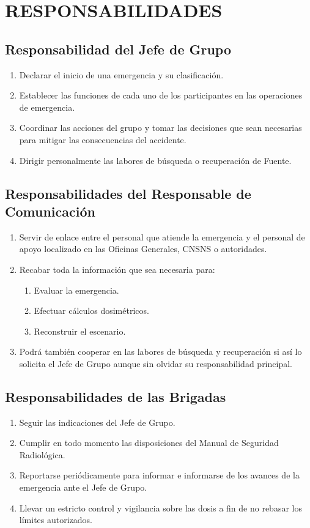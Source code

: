 \section*{RESPONSABILIDADES}

\subsection*{Responsabilidad del Jefe de Grupo}
\begin{enumerate}
    \item Declarar el inicio de una emergencia y su clasificación.
    \item Establecer las funciones de cada uno de los participantes en las operaciones de emergencia.
    \item Coordinar las acciones del grupo y tomar las decisiones que sean necesarias para mitigar las consecuencias del accidente.
    \item Dirigir personalmente las labores de búsqueda o recuperación de Fuente.
\end{enumerate}

\subsection*{Responsabilidades del Responsable de Comunicación}
\begin{enumerate}
    \item Servir de enlace entre el personal que atiende la emergencia y el personal de apoyo localizado en las Oficinas Generales, CNSNS o autoridades.
    \item Recabar toda la información que sea necesaria para:
    \begin{enumerate}[label=\roman*.]
        \item Evaluar la emergencia.
        \item Efectuar cálculos dosimétricos.
        \item Reconstruir el escenario.
    \end{enumerate}
    \item Podrá también cooperar en las labores de búsqueda y recuperación si así lo solicita el Jefe de Grupo aunque sin olvidar su responsabilidad principal.
\end{enumerate}

\subsection*{Responsabilidades de las Brigadas}
\begin{enumerate}
    \item Seguir las indicaciones del Jefe de Grupo.
    \item Cumplir en todo momento las disposiciones del Manual de Seguridad Radiológica.
    \item Reportarse periódicamente para informar e informarse de los avances de la emergencia ante el Jefe de Grupo.
    \item Llevar un estricto control y vigilancia sobre las dosis a fin de no rebasar los límites autorizados.
\end{enumerate}
